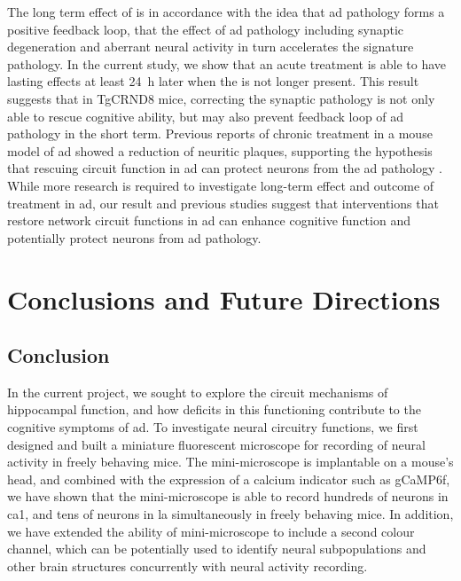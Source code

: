 The long term effect of \tglu{} is in accordance with the idea that \gls{ad} pathology forms a positive feedback loop, that the effect of \gls{ad} pathology including synaptic degeneration and aberrant neural activity in turn accelerates the signature pathology. In the current study, we show that an acute \tglu{} treatment is able to have lasting effects at least \SI{24}{\hour} later when the \tglu{} is not longer present. This result suggests that in TgCRND8 mice, correcting the synaptic pathology is not only able to rescue cognitive ability, but may also prevent feedback loop of \gls{ad} pathology in the short term. Previous reports of chronic \tglu{} treatment in a mouse model of \gls{ad} showed a reduction of neuritic plaques, supporting the hypothesis that rescuing circuit function in \gls{ad} can protect neurons from the \gls{ad} pathology \citep{dong15}. While more research is required to investigate long-term effect and outcome of \tglu{} treatment in \gls{ad}, our result and previous studies \citep{roy16, migues16, dong15} suggest that interventions that restore network circuit functions in \gls{ad} can enhance cognitive function and potentially protect neurons from \gls{ad} pathology. 

\chapter{Conclusions and Future Directions}

\section{Conclusion}

In the current project, we sought to explore the circuit mechanisms of hippocampal function, and how deficits in this functioning contribute to the cognitive symptoms of \gls{ad}. To investigate neural circuitry functions, we first designed and built a miniature fluorescent microscope for recording of neural activity in freely behaving mice. The mini-microscope is implantable on a mouse's head, and combined with the expression of a calcium indicator such as gCaMP6f, we have shown that the mini-microscope is able to record hundreds of neurons in \gls{ca1}, and tens of neurons in \gls{la} simultaneously in freely behaving mice. In addition, we have extended the ability of mini-microscope to include a second colour channel, which can be potentially used to identify neural subpopulations and other brain structures concurrently with neural activity recording.

